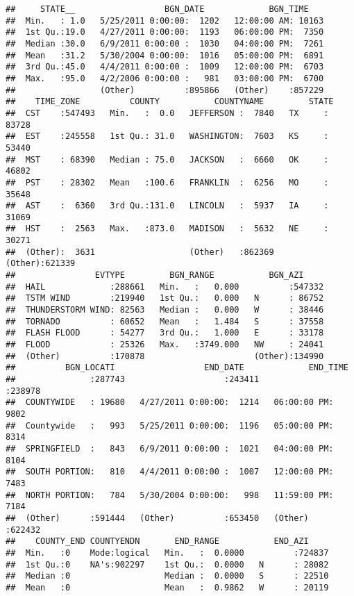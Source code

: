 \documentclass[]{article}
\begin{document}
\begin{verbatim}
##     STATE__                  BGN_DATE             BGN_TIME     
##  Min.   : 1.0   5/25/2011 0:00:00:  1202   12:00:00 AM: 10163  
##  1st Qu.:19.0   4/27/2011 0:00:00:  1193   06:00:00 PM:  7350  
##  Median :30.0   6/9/2011 0:00:00 :  1030   04:00:00 PM:  7261  
##  Mean   :31.2   5/30/2004 0:00:00:  1016   05:00:00 PM:  6891  
##  3rd Qu.:45.0   4/4/2011 0:00:00 :  1009   12:00:00 PM:  6703  
##  Max.   :95.0   4/2/2006 0:00:00 :   981   03:00:00 PM:  6700  
##                 (Other)          :895866   (Other)    :857229  
##    TIME_ZONE          COUNTY           COUNTYNAME         STATE       
##  CST    :547493   Min.   :  0.0   JEFFERSON :  7840   TX     : 83728  
##  EST    :245558   1st Qu.: 31.0   WASHINGTON:  7603   KS     : 53440  
##  MST    : 68390   Median : 75.0   JACKSON   :  6660   OK     : 46802  
##  PST    : 28302   Mean   :100.6   FRANKLIN  :  6256   MO     : 35648  
##  AST    :  6360   3rd Qu.:131.0   LINCOLN   :  5937   IA     : 31069  
##  HST    :  2563   Max.   :873.0   MADISON   :  5632   NE     : 30271  
##  (Other):  3631                   (Other)   :862369   (Other):621339  
##                EVTYPE         BGN_RANGE           BGN_AZI      
##  HAIL             :288661   Min.   :   0.000          :547332  
##  TSTM WIND        :219940   1st Qu.:   0.000   N      : 86752  
##  THUNDERSTORM WIND: 82563   Median :   0.000   W      : 38446  
##  TORNADO          : 60652   Mean   :   1.484   S      : 37558  
##  FLASH FLOOD      : 54277   3rd Qu.:   1.000   E      : 33178  
##  FLOOD            : 25326   Max.   :3749.000   NW     : 24041  
##  (Other)          :170878                      (Other):134990  
##          BGN_LOCATI                  END_DATE             END_TIME     
##               :287743                    :243411              :238978  
##  COUNTYWIDE   : 19680   4/27/2011 0:00:00:  1214   06:00:00 PM:  9802  
##  Countywide   :   993   5/25/2011 0:00:00:  1196   05:00:00 PM:  8314  
##  SPRINGFIELD  :   843   6/9/2011 0:00:00 :  1021   04:00:00 PM:  8104  
##  SOUTH PORTION:   810   4/4/2011 0:00:00 :  1007   12:00:00 PM:  7483  
##  NORTH PORTION:   784   5/30/2004 0:00:00:   998   11:59:00 PM:  7184  
##  (Other)      :591444   (Other)          :653450   (Other)    :622432  
##    COUNTY_END COUNTYENDN       END_RANGE           END_AZI      
##  Min.   :0    Mode:logical   Min.   :  0.0000          :724837  
##  1st Qu.:0    NA's:902297    1st Qu.:  0.0000   N      : 28082  
##  Median :0                   Median :  0.0000   S      : 22510  
##  Mean   :0                   Mean   :  0.9862   W      : 20119  

\end{verbatim}
\end{document}

